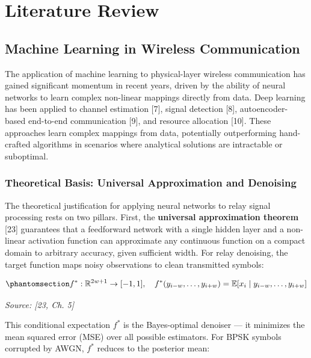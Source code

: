 \chapter{Literature Review}\label{sec:literature-review}

\section{Machine Learning in Wireless Communication}\label{sec:machine-learning-in-wireless-communication}

The application of machine learning to physical-layer wireless communication has gained significant momentum in recent years, driven by the ability of neural networks to learn complex non-linear mappings directly from data. Deep learning has been applied to channel estimation {[}7{]}, signal detection {[}8{]}, autoencoder-based end-to-end communication {[}9{]}, and resource allocation {[}10{]}. These approaches learn complex mappings from data, potentially outperforming hand-crafted algorithms in scenarios where analytical solutions are intractable or suboptimal.

\subsection{Theoretical Basis: Universal Approximation and Denoising}\label{sec:theoretical-basis-universal-approximation-and-denoising}

The theoretical justification for applying neural networks to relay signal processing rests on two pillars. First, the \textbf{universal approximation theorem} {[}23{]} guarantees that a feedforward network with a single hidden layer and a non-linear activation function can approximate any continuous function on a compact domain to arbitrary accuracy, given sufficient width. For relay denoising, the target function maps noisy observations to clean transmitted symbols:

\begin{equation}\protect\phantomsection\label{eq:optimal-denoiser}{f^*: \mathbb{R}^{2w+1} \to [-1, 1], \quad f^*(y_{i-w}, \dots, y_{i+w}) = \mathbb{E}[x_i \mid y_{i-w}, \dots, y_{i+w}]
}\end{equation} \par{\small\textit{Source: [23, Ch. 5]}}

This conditional expectation \(f^*\) is the Bayes-optimal denoiser --- it minimizes the mean squared error (MSE) over all possible estimators. For BPSK symbols corrupted by AWGN, \(f^*\) reduces to the posterior mean:

